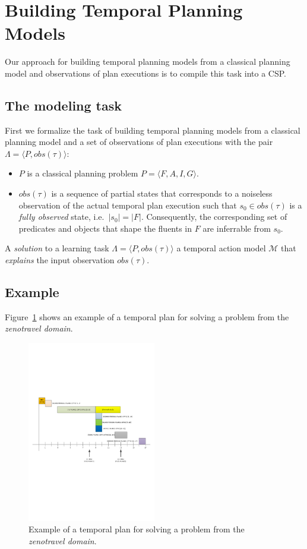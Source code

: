 \documentclass[letterpaper]{article} %
\newcommand{\tup}[1]{{\langle #1 \rangle}}
\begin{document}
\section{Building Temporal Planning Models}
\label{sec:learning}
Our approach for building temporal planning models from a classical planning model and observations of plan executions is to compile this task into a CSP. 

\subsection{The modeling task}
First we formalize the task of building temporal planning models from a classical planning model and a set of observations of plan executions with the pair $\Lambda=\tup{P,obs(\tau)}$:
\begin{itemize}
\item $P$ is a classical planning problem $P=\tup{F,A,I,G}$.
\item $obs(\tau)$ is a sequence of partial states that corresponds to a noiseless observation of the actual temporal plan execution such that $s_0\in obs(\tau)$ is a {\em fully observed} state, i.e.~$|s_0|=|F|$. Consequently, the corresponding set of predicates and objects that shape the fluents in $F$ are inferrable from $s_0$. 
\end{itemize}

A {\em solution} to a learning task $\Lambda=\tup{P,obs(\tau)}$ a temporal action model $\mathcal{M}$ that {\em explains} the input observation $obs(\tau)$.

\subsection{Example}
Figure~\ref{fig:plan} shows an example of a temporal plan for solving a problem from the {\em zenotravel domain}.

\begin{figure}[hbt!]
        \includegraphics[width=0.5\textwidth]{plan.pdf}
	\caption{Example of a temporal plan for solving a problem from the {\em zenotravel domain}.}
	\label{fig:plan}
\end{figure}
\end{document}

